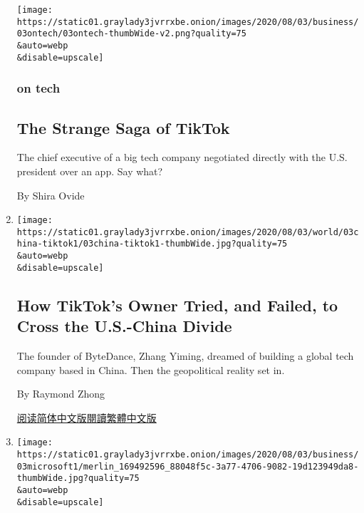 \begin{enumerate}
  \texttt{[image: https://static01.graylady3jvrrxbe.onion/images/2020/08/03/business/03ontech/03ontech-thumbWide-v2.png?quality=75\\\&auto=webp\\\&disable=upscale]}

  \hypertarget{on-tech-1}{%
  \subsubsection{on tech}\label{on-tech-1}}

  \hypertarget{the-strange-saga-of-tiktok}{%
  \subsection{The Strange Saga of
  TikTok}\label{the-strange-saga-of-tiktok}}

  The chief executive of a big tech company negotiated directly with the
  U.S. president over an app. Say what?

  By Shira Ovide
\item
  \href{/2020/08/03/technology/tiktok-bytedance-us-china.html}{}

  \texttt{[image: https://static01.graylady3jvrrxbe.onion/images/2020/08/03/world/03china-tiktok1/03china-tiktok1-thumbWide.jpg?quality=75\\\&auto=webp\\\&disable=upscale]}

  \hypertarget{how-tiktoks-owner-tried-and-failed-to-cross-the-us-china-divide}{%
  \subsection{How TikTok's Owner Tried, and Failed, to Cross the
  U.S.-China
  Divide}\label{how-tiktoks-owner-tried-and-failed-to-cross-the-us-china-divide}}

  The founder of ByteDance, Zhang Yiming, dreamed of building a global
  tech company based in China. Then the geopolitical reality set in.

  By Raymond Zhong

  \href{https://cn.nytimes3xbfgragh.onion/technology/20200804/tiktok-trump-sale-microsoft/}{阅读简体中文版}\href{https://cn.nytimes3xbfgragh.onion/technology/20200804/tiktok-trump-sale-microsoft/zh-hant/}{閱讀繁體中文版}
\item
  \href{/2020/08/03/technology/tiktok-microsoft-tweens.html}{}

  \texttt{[image: https://static01.graylady3jvrrxbe.onion/images/2020/08/03/business/03microsoft1/merlin\_169492596\_88048f5c-3a77-4706-9082-19d123949da8-thumbWide.jpg?quality=75\\\&auto=webp\\\&disable=upscale]}


\end{enumerate}
